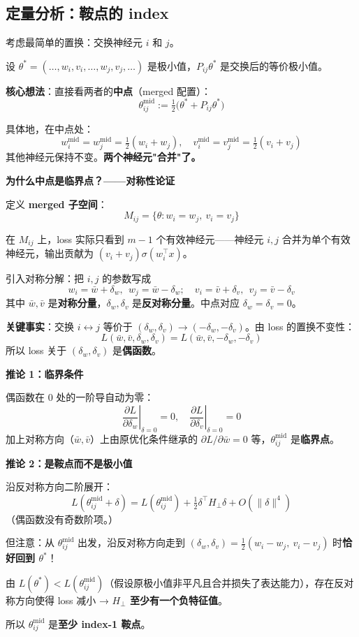 \documentclass[12pt, a4paper]{ctexart}
\begin{document}
\subsection{定量分析：鞍点的 index}

\begin{blackboard}

考虑最简单的置换：交换神经元 $i$ 和 $j$。

设 $\theta^* = (\ldots, w_i, v_i, \ldots, w_j, v_j, \ldots)$ 是极小值，$P_{ij}\theta^*$ 是交换后的等价极小值。

\textbf{核心想法}：直接看两者的\textbf{中点}（merged 配置）：
\[
\theta^{\text{mid}}_{ij} := \tfrac{1}{2}\bigl(\theta^* + P_{ij}\theta^*\bigr)
\]

具体地，在中点处：
\[
w_i^{\text{mid}} = w_j^{\text{mid}} = \tfrac{1}{2}(w_i + w_j), \quad v_i^{\text{mid}} = v_j^{\text{mid}} = \tfrac{1}{2}(v_i + v_j)
\]
其他神经元保持不变。\textbf{两个神经元"合并"了。}

\textbf{为什么中点是临界点？——对称性论证}

定义 \textbf{merged 子空间}：
\[
M_{ij} = \{\theta : w_i = w_j,\ v_i = v_j\}
\]

在 $M_{ij}$ 上，loss 实际只看到 $m-1$ 个有效神经元——神经元 $i, j$ 合并为单个有效神经元，输出贡献为 $(v_i + v_j)\sigma(w_i^\top x)$。

引入对称分解：把 $i, j$ 的参数写成
\[
w_i = \bar{w} + \delta_w,\ \ w_j = \bar{w} - \delta_w; \quad v_i = \bar{v} + \delta_v,\ \ v_j = \bar{v} - \delta_v
\]
其中 $\bar{w}, \bar{v}$ 是\textbf{对称分量}，$\delta_w, \delta_v$ 是\textbf{反对称分量}。中点对应 $\delta_w = \delta_v = 0$。

\textbf{关键事实}：交换 $i \leftrightarrow j$ 等价于 $(\delta_w, \delta_v) \to (-\delta_w, -\delta_v)$。由 loss 的置换不变性：
\[
L(\bar{w}, \bar{v}, \delta_w, \delta_v) = L(\bar{w}, \bar{v}, -\delta_w, -\delta_v)
\]
所以 loss 关于 $(\delta_w, \delta_v)$ 是\textbf{偶函数}。

\textbf{推论 1：临界条件}

偶函数在 0 处的一阶导自动为零：
\[
\left.\frac{\partial L}{\partial \delta_w}\right|_{\delta=0} = 0, \quad \left.\frac{\partial L}{\partial \delta_v}\right|_{\delta=0} = 0
\]
加上对称方向（$\bar{w}, \bar{v}$）上由原优化条件继承的 $\partial L / \partial \bar{w} = 0$ 等，$\theta^{\text{mid}}_{ij}$ 是\textbf{临界点}。

\textbf{推论 2：是鞍点而不是极小值}

沿反对称方向二阶展开：
\[
L(\theta^{\text{mid}}_{ij} + \delta) = L(\theta^{\text{mid}}_{ij}) + \tfrac{1}{2}\delta^\top H_\perp \delta + O(\|\delta\|^4)
\]
（偶函数没有奇数阶项。）

但注意：从 $\theta^{\text{mid}}_{ij}$ 出发，沿反对称方向走到 $(\delta_w, \delta_v) = \tfrac{1}{2}(w_i - w_j,\ v_i - v_j)$ 时\textbf{恰好回到 $\theta^*$}！

由 $L(\theta^*) < L(\theta^{\text{mid}}_{ij})$（假设原极小值非平凡且合并损失了表达能力），存在反对称方向使得 loss 减小 → \textbf{$H_\perp$ 至少有一个负特征值}。

所以 $\theta^{\text{mid}}_{ij}$ 是\textbf{至少 index-1 鞍点}。

\end{blackboard}
\end{document}
